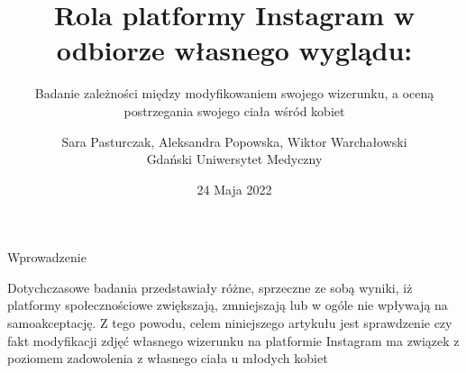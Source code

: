 \documentclass[pdf]{beamer}
\title{Rola platformy Instagram w odbiorze własnego wyglądu:}
\subtitle{Badanie zależności między modyfikowaniem swojego wizerunku, a oceną postrzegania swojego ciała wśród kobiet}
\author{Sara Pasturczak, Aleksandra Popowska, Wiktor Warchałowski\\Gdański Uniwersytet Medyczny}
\date{24 Maja 2022}
\begin{document}
\begin{frame}
  \titlepage
\end{frame}

\begin{frame}{Wprowadzenie}
\begin{center}
Dotychczasowe badania przedstawiały różne, sprzeczne ze sobą wyniki, iż platformy społecznościowe zwiększają, zmniejszają lub w ogóle nie wpływają na samoakceptację. Z tego powodu, celem niniejszego artykułu jest sprawdzenie czy fakt modyfikacji zdjęć własnego wizerunku na platformie Instagram ma związek z poziomem zadowolenia z własnego ciała u młodych kobiet
\end{center}
\end{frame}
\end{document}
